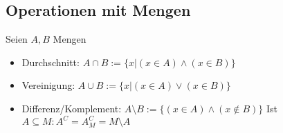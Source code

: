 \documentclass{article}
\begin{document}
        \subsection{Operationen mit Mengen}
            Seien $A,B$ Mengen
            \begin{itemize}
                \item Durchschnitt: $A\cap B :=\{x|(x\in A)\land (x\in B)\}$
                \item Vereinigung: $A\cup B :=\{x|(x\in A)\lor (x\in B)\}$
                \item Differenz/Komplement: $A\setminus B :=\{(x\in A)\land (x \notin B)\}$
                \subitem Ist $A\subseteq M: A^C=A^C_M=M\setminus A $
            \end{itemize}
\end{document}
